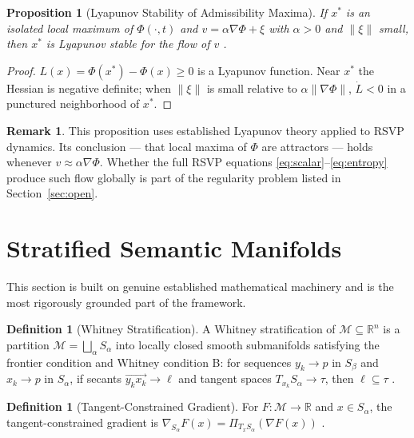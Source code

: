 \documentclass[12pt, a4paper]{article}
\theoremstyle{rsvpstyle}
\newtheorem{proposition}[theorem]{Proposition}
\theoremstyle{definition}
\newtheorem{definition}[theorem]{Definition}
\newtheorem{remark}[theorem]{Remark}
\newcommand{\OpMan}{\mathcal{M}}
\begin{document}
\begin{proposition}[Lyapunov Stability of Admissibility Maxima]
\label{prop:lyap}
If $x^*$ is an isolated local maximum of $\Phi(\cdot,t)$ and
$v = \alpha\nabla\Phi + \xi$ with $\alpha > 0$ and $\|\xi\|$ small, then $x^*$
is Lyapunov stable for the flow of $v$ \citep{Arnold1989}.
\end{proposition}

\begin{proof}
$L(x) = \Phi(x^*) - \Phi(x) \geq 0$ is a Lyapunov function. Near $x^*$ the
Hessian is negative definite; when $\|\xi\|$ is small relative to
$\alpha\|\nabla\Phi\|$, $\dot{L} < 0$ in a punctured neighborhood of $x^*$.
\end{proof}

\begin{remark}
This proposition uses established Lyapunov theory applied to RSVP
dynamics. Its conclusion --- that local maxima of $\Phi$ are attractors ---
holds whenever $v \approx \alpha\nabla\Phi$. Whether the full RSVP equations
\eqref{eq:scalar}--\eqref{eq:entropy} produce such flow globally is part of the
regularity problem listed in Section~\ref{sec:open}.
\end{remark}

\section{Stratified Semantic Manifolds}

This section is built on genuine established mathematical machinery and is
the most rigorously grounded part of the framework.

\begin{definition}[Whitney Stratification]
A Whitney stratification of $\OpMan \subseteq \mathbb{R}^n$ is a partition
$\OpMan = \bigsqcup_\alpha S_\alpha$ into locally closed smooth submanifolds
satisfying the frontier condition and Whitney condition B: for sequences
$y_k \to p$ in $S_\beta$ and $x_k \to p$ in $S_\alpha$, if secants
$\overrightarrow{y_kx_k} \to \ell$ and tangent spaces $T_{x_k}S_\alpha \to \tau$,
then $\ell \subseteq \tau$ \citep{Whitney1965,Mather1973}.
\end{definition}

\begin{definition}[Tangent-Constrained Gradient]
For $F : \OpMan \to \mathbb{R}$ and $x \in S_\alpha$, the tangent-constrained
gradient is $\nabla_{S_\alpha}F(x) = \Pi_{T_xS_\alpha}(\nabla F(x))$
\citep{Lee2013}.
\end{definition}
\end{document}
